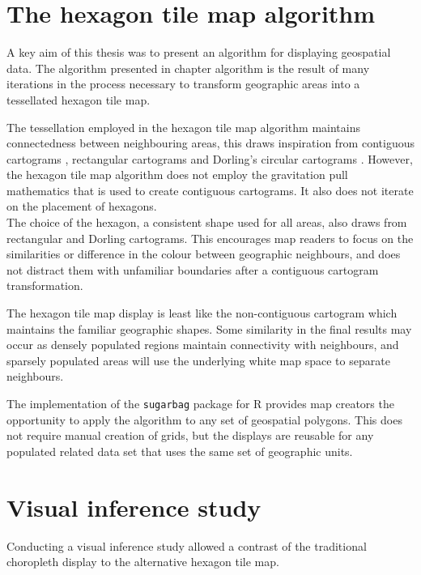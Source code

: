 \documentclass{monashthesis}
\begin{document}
\hypertarget{the-hexagon-tile-map-algorithm}{%
\section{The hexagon tile map algorithm}\label{the-hexagon-tile-map-algorithm}}

A key aim of this thesis was to present an algorithm for displaying geospatial data. The algorithm presented in chapter algorithm is the result of many iterations in the process necessary to transform geographic areas into a tessellated hexagon tile map.

The tessellation employed in the hexagon tile map algorithm maintains connectedness between neighbouring areas, this draws inspiration from contiguous cartograms \autocite{ACA}, rectangular cartograms \autocite{RSCW} and Dorling's circular cartograms \autocite{ACTUC}. However, the hexagon tile map algorithm does not employ the gravitation pull mathematics that is used to create contiguous cartograms. It also does not iterate on the placement of hexagons.\\
The choice of the hexagon, a consistent shape used for all areas, also draws from rectangular and Dorling cartograms. This encourages map readers to focus on the similarities or difference in the colour between geographic neighbours, and does not distract them with unfamiliar boundaries after a contiguous cartogram transformation.

The hexagon tile map display is least like the non-contiguous cartogram \autocite{NAC} which maintains the familiar geographic shapes. Some similarity in the final results may occur as densely populated regions maintain connectivity with neighbours, and sparsely populated areas will use the underlying white map space to separate neighbours.

The implementation of the \texttt{sugarbag} \autocite{sugarbag} package for R \autocite{R} provides map creators the opportunity to apply the algorithm to any set of geospatial polygons. This does not require manual creation of grids, but the displays are reusable for any populated related data set that uses the same set of geographic units.

\hypertarget{visual-inference-study-1}{%
\section{Visual inference study}\label{visual-inference-study-1}}

Conducting a visual inference study allowed a contrast of the traditional choropleth display to the alternative hexagon tile map.
\end{document}
